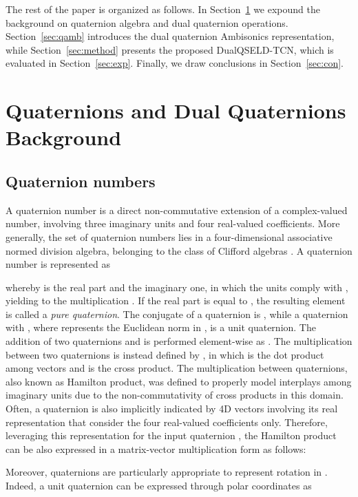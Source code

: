 \documentclass[3p, preprint, twocolumn]{elsarticle}
\begin{document}
The rest of the paper is organized as follows. In Section~\ref{sec:qnn} we expound the background on quaternion algebra and dual quaternion operations. Section~\ref{sec:qamb} introduces the dual quaternion Ambisonics representation, while Section~\ref{sec:method} presents the proposed DualQSELD-TCN, which is evaluated in Section~\ref{sec:exp}. Finally, we draw conclusions in Section~\ref{sec:con}.


\section{Quaternions and Dual Quaternions Background}
\label{sec:qnn}

\subsection{Quaternion numbers}

A quaternion number is a direct non-commutative extension of a complex-valued number, involving three imaginary units and four real-valued coefficients. More generally, the set of quaternion numbers  lies in a four-dimensional associative normed division algebra, belonging to the class of Clifford algebras \cite{Ward1997}. A quaternion number is represented as



\noindent whereby  is the real part and  the imaginary one, in which the units comply with , yielding to the multiplication . If the real part  is equal to , the resulting element is called a \textit{pure quaternion}. The conjugate of a quaternion is , while a quaternion with , where  represents the Euclidean norm in , is a unit quaternion. The addition of two quaternions  and  is performed element-wise as . The multiplication between two quaternions is instead defined by , in which  is the dot product among vectors and  is the cross product. The multiplication between quaternions, also known as Hamilton product, was defined to properly model interplays among imaginary units due to the non-commutativity of cross products in this domain. Often, a quaternion is also implicitly indicated by 4D vectors involving its real representation that consider the four real-valued coefficients only. Therefore, leveraging this representation for the input quaternion , the Hamilton product can be also expressed in a matrix-vector multiplication form as follows:



Moreover, quaternions are particularly appropriate to represent rotation in . Indeed, a unit quaternion can be expressed through polar coordinates as 
\end{document}
